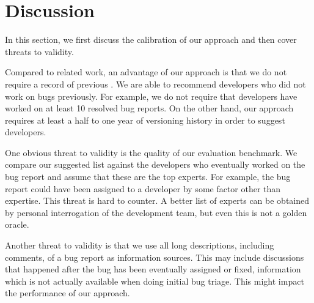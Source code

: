 \section{Discussion}\label{sec:discussion}

In this section, we first discuss the calibration of our approach and then cover threats to validity.

Compared to related work, an advantage of our approach is that we do not require a record of previous \BRs. We are able to recommend developers who did not work on bugs previously. For example, we do not require that developers have worked on at least 10 resolved bug reports. On the other hand, our approach requires at least a half to one year of versioning history in order to suggest developers. 

One obvious threat to validity is the quality of our evaluation benchmark. We compare our suggested list against the developers who eventually worked on the bug report and assume that these are the top experts. For example, the bug report could have been assigned to a developer by some factor other than expertise. This threat is hard to counter. A better list of experts can be obtained by personal interrogation of the development team, but even this is not a golden oracle.

Another threat to validity is that we use all long descriptions, including comments, of a bug report as information sources. This may include discussions that happened after the bug has been eventually assigned or fixed, information which is not actually available when doing initial bug triage. This might impact the performance of our approach. 


